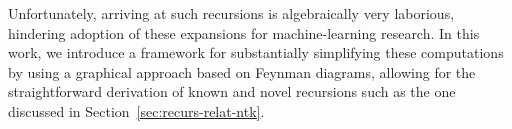 Unfortunately, arriving at such recursions is algebraically very laborious, hindering adoption of these expansions for machine-learning research. In this work, we introduce a framework for substantially simplifying these computations by using a graphical approach based on Feynman diagrams, allowing for the straightforward derivation of known and novel recursions such as the one discussed in Section~\ref{sec:recurs-relat-ntk}.


